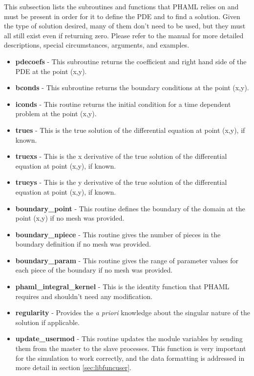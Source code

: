 This subsection lists the subroutines and functions that PHAML relies on and must be present in order for it to define the PDE and to find a solution.  Given the type of solution desired, many of them don't need to be used, but they must all still exist even if returning zero.  Please refer to the manual for more detailed descriptions, special circumstances, arguments, and examples.  \citep{phamldoc}

\begin{itemize}
\item \textbf{pdecoefs} - This subroutine returns the coefficient and right hand side of the PDE at the point (x,y). 
\item \textbf{bconds} - This subroutine returns the boundary conditions at the point (x,y).
\item \textbf{iconds} - This routine returns the initial condition for a time dependent problem at the point (x,y).
\item \textbf{trues} - This is the true solution of the differential equation at point (x,y), if known.
\item \textbf{truexs} - This is the x derivative of the true solution of the differential equation at point (x,y), if known.
\item \textbf{trueys} - This is the y derivative of the true solution of the differential equation at point (x,y), if known. 
\item \textbf{boundary\_point} -  This routine defines the boundary of the domain at the point (x,y) if no mesh was provided. 
\item \textbf{boundary\_npiece} - This routine gives the number of pieces in the boundary definition if no mesh was provided. 
\item \textbf{boundary\_param} - This routine gives the range of parameter values for each piece of the boundary if no mesh was provided.
\item \textbf{phaml\_integral\_kernel} - This is the identity function that PHAML requires and shouldn't need any modification.
\item \textbf{regularity} - Provides the \emph{a priori} knowledge about the singular nature of the solution if applicable.
\item \textbf{update\_usermod} - This routine updates the module variables by sending them from the master to the slave processes.  This function is very important for the simulation to work correctly, and the data formatting is addressed in more detail in section \ref{sec:libfuncuser}.

\end{itemize}

